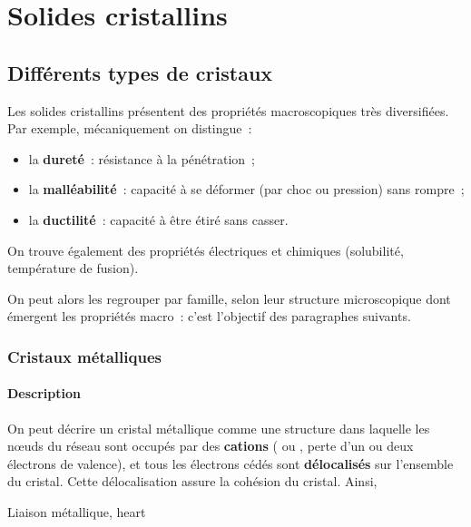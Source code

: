 \documentclass[../main/main.tex]{subfiles}
\begin{document}
\setcounter{chapter}{2}

\chapter{Solides cristallins}

\setcounter{section}{3}
\section{Différents types de cristaux}
Les solides cristallins présentent des propriétés macroscopiques très
diversifiées. Par exemple, mécaniquement on distingue~:
\begin{itemize}
  \item la \textbf{dureté}~: résistance à la pénétration~;
  \item la \textbf{malléabilité}~: capacité à se déformer (par choc ou pression)
    sans rompre~;
  \item la \textbf{ductilité}~: capacité à être étiré sans casser.
\end{itemize}
On trouve également des propriétés électriques et chimiques (solubilité,
température de fusion).

On peut alors les regrouper par famille, selon leur structure microscopique dont
émergent les propriétés macro~: c'est l'objectif des paragraphes suivants.

\subsection{Cristaux métalliques}
\subsubsection{Description}
On peut décrire un cristal métallique comme une structure dans laquelle les
nœuds du réseau sont occupés par des \textbf{cations} ( ou ,
perte d'un ou deux électrons de valence), et tous les électrons cédés sont
\textbf{délocalisés} sur l'ensemble du cristal. Cette délocalisation assure la
cohésion du cristal. Ainsi,
\begin{tprop}{Liaison métallique, heart}
\end{tprop}
\end{document}
